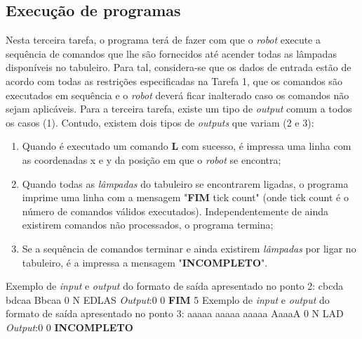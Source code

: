 \documentclass[12pt,a4paper]{article}
\begin{document}
\subsection{Execu\c{c}ão de programas}
\textsf{ \indent Nesta terceira tarefa, o programa terá de fazer com que o \textit{robot} execute a sequência de comandos que lhe são fornecidos até acender todas as lâmpadas disponíveis no tabuleiro. Para tal, considera-se que os dados de entrada estão de acordo com todas as restrições especificadas na Tarefa 1, que os comandos são executados em sequência e o \textit{robot} deverá ficar inalterado caso os comandos não sejam aplicáveis. 
\newline \indent Para a terceira tarefa, existe um tipo de \textit{output} comum a todos os casos (1). Contudo, existem dois tipos de \textit{outputs} que variam (2 e 3):}
\begin{enumerate}

\item \textsf{Quando é executado um comando \textbf{L} com sucesso, é impressa uma linha com as coordenadas x e y da posição em que o \textit{robot} se encontra;}
\item \textsf {Quando todas as \textit{lâmpadas} do tabuleiro se encontrarem ligadas, o programa imprime uma linha com a mensagem "\textbf{FIM} tick count" (onde tick count é o número de comandos válidos executados). Independentemente de ainda existirem comandos não processados, o programa termina; }
\item \textsf{Se a sequência de comandos terminar e ainda existirem \textit{lâmpadas} por ligar no tabuleiro, é a impressa a mensagem "\textbf{INCOMPLETO}".}
\end{enumerate}

\textsf{ \indent Exemplo de \textit{input} e \textit{output} do formato de saída apresentado no ponto 2:  \newline\indent\indent cbcda \newline\indent\indent bdcaa \newline\indent\indent Bbcaa \newline\indent{} 0 N \newline\indent\indent EDLAS \newline \indent \indent \textit{Output}:0 0 \newline \indent \indent \indent \indent \textbf{FIM} 5 }
\newline
\textsf{ \indent Exemplo de \textit{input} e \textit{output} do formato de saída apresentado no ponto 3: \newline\indent\indent aaaaa \newline\indent\indent aaaaa \newline\indent\indent aaaaa \newline\indent\indent AaaaA \newline \indent {} 0 N \newline\indent\indent LAD \newline \indent \indent \textit{Output}:0 0 \newline \indent \indent \indent \indent \textbf{INCOMPLETO} }
\end{document}
